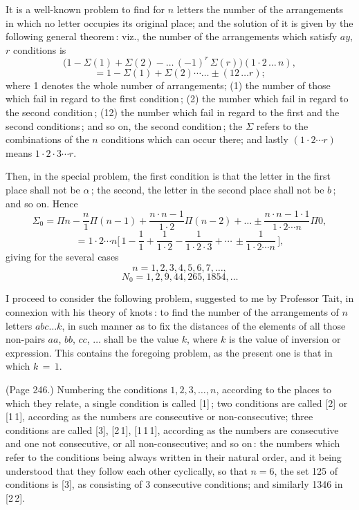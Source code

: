 \documentclass[11pt,a4paper]{article}
\theoremstyle{plain}
\theoremstyle{definition}
\begin{document}
\medskip

\noindent It is a well-known problem to find for $n$ letters the number of the arrangements in which no letter occupies its original place; and the solution of it is given by the following general theorem\,: viz., the number of the arrangements which satisfy $a y$, $r$ conditions is
\[
( 1 - \Sigma(1) + \Sigma(2) - \ldots\,(- 1)^r\,\Sigma(r)\big) (1\cdot 2\,\ldots\,n),
\]
\[
= 1 - \Sigma(1) + \Sigma(2) \cdots\ldots \pm(12\,\ldots r);
\]
where 1 denotes the whole number of arrangements; (1) the number of those which fail in regard to the first condition\,; (2) the number which fail in regard to the second condition\,; (12) the number which fail in regard to the first and the second conditions\,; and so on, the second condition\,; the $\Sigma$ refers to the combinations of the $n$ conditions which can occur there; and lastly $(1\cdot 2\cdots r)$ means $1\cdot 2\cdot 3\cdots r$.

Then, in the special problem, the first condition is that the letter in the first place shall not be $\alpha$\,; the second, the letter in the second place shall not be $b$\,; and so on. Hence
\[
\Sigma_0 = \Pi n - \frac{n}{1}\Pi(n - 1) + \frac{n\cdot n - 1}{1\cdot 2}\Pi(n - 2) + \ldots \pm \frac{n\cdot n - 1\cdot 1}{1\cdot 2\cdots n}\Pi 0,
\]
\[
= 1\cdot 2\cdots n\Big[\,1 - \frac{1}{1} + \frac{1}{1\cdot 2} - \frac{1}{1\cdot 2\cdot 3} + \cdots\,\pm \frac{1}{1\cdot 2\cdots n}\,\Big],
\]
giving for the several cases
\[
n = 1, 2, 3, 4, 5, 6, 7, \ldots,
\]
\[
N_0 = 1, 2, 9, 44, 265, 1854, \ldots
\]

I proceed to consider the following problem, suggested to me by Professor Tait, in connexion with his theory of knots\,: to find the number of the arrangements of $n$ letters $abc\ldots k$, in such manner as to fix the distances of the elements of all those non-pairs $aa$, $bb$, $cc$, $\ldots$ shall be the value $k$, where $k$ is the value of inversion or expression. This contains the foregoing problem, as the present one is that in which $k\,=\,1$.

\medskip

\noindent (Page 246.) Numbering the conditions $1, 2, 3, \ldots, n$, according to the places to which they relate, a single condition is called [1]\,; two conditions are called [2] or [1\,1], according as the numbers are consecutive or non-consecutive; three conditions are called [3], [2\,1], [1\,1\,1], according as the numbers are consecutive and one not consecutive, or all non-consecutive; and so on\,: the numbers which refer to the conditions being always written in their natural order, and it being understood that they follow each other cyclically, so that $n = 6$, the set 125 of conditions is [3], as consisting of 3 consecutive conditions; and similarly 1346 in [2\,2].
\end{document}
